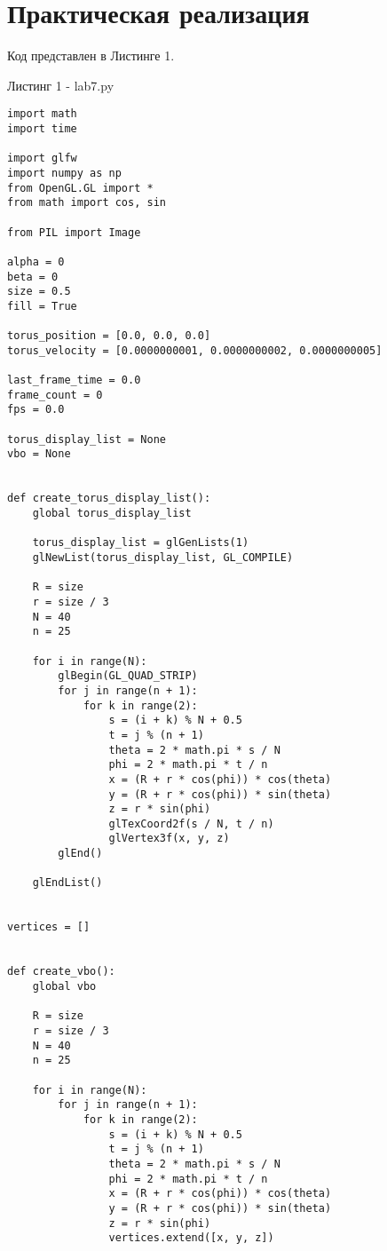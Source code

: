 \documentclass[a4paper, 14pt]{extarticle}
\begin{document}
\section{Практическая реализация}
Код представлен в Листинге 1.
\par
\begin{center}
    Листинг 1 - lab7.py
\end{center}

\begin{lstlisting}
import math
import time

import glfw
import numpy as np
from OpenGL.GL import *
from math import cos, sin

from PIL import Image

alpha = 0
beta = 0
size = 0.5
fill = True

torus_position = [0.0, 0.0, 0.0]
torus_velocity = [0.0000000001, 0.0000000002, 0.0000000005]

last_frame_time = 0.0
frame_count = 0
fps = 0.0

torus_display_list = None
vbo = None


def create_torus_display_list():
    global torus_display_list

    torus_display_list = glGenLists(1)
    glNewList(torus_display_list, GL_COMPILE)

    R = size
    r = size / 3
    N = 40
    n = 25

    for i in range(N):
        glBegin(GL_QUAD_STRIP)
        for j in range(n + 1):
            for k in range(2):
                s = (i + k) % N + 0.5
                t = j % (n + 1)
                theta = 2 * math.pi * s / N
                phi = 2 * math.pi * t / n
                x = (R + r * cos(phi)) * cos(theta)
                y = (R + r * cos(phi)) * sin(theta)
                z = r * sin(phi)
                glTexCoord2f(s / N, t / n)
                glVertex3f(x, y, z)
        glEnd()

    glEndList()


vertices = []


def create_vbo():
    global vbo

    R = size
    r = size / 3
    N = 40
    n = 25

    for i in range(N):
        for j in range(n + 1):
            for k in range(2):
                s = (i + k) % N + 0.5
                t = j % (n + 1)
                theta = 2 * math.pi * s / N
                phi = 2 * math.pi * t / n
                x = (R + r * cos(phi)) * cos(theta)
                y = (R + r * cos(phi)) * sin(theta)
                z = r * sin(phi)
                vertices.extend([x, y, z])


\end{lstlisting}
\end{document}
